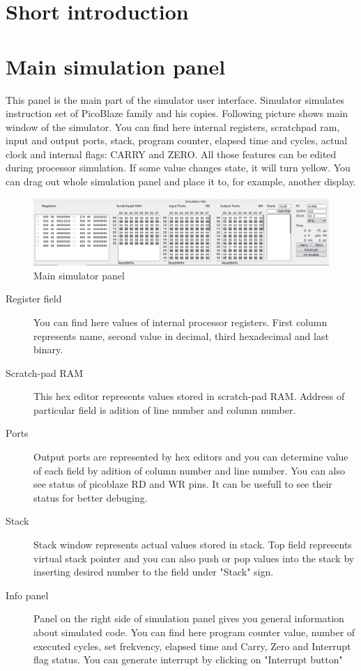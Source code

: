 \section{Short introduction}



\section{Main simulation panel}
    This panel is the main part of the simulator user interface. Simulator simulates instruction set of PicoBlaze family and his copies.
    Following picture shows main window of the simulator. You can find here internal registers, scratchpad ram, input and output ports, stack,
    program counter, elapsed time and cycles, actual clock and internal flags: CARRY and ZERO. All those features can be edited during
    processor simulation. If some value changes state, it will turn yellow. You can drag out whole simulation panel and place it to, for example, another display.
    
   \begin{figure}[h!]
        \centering
        \includegraphics[width=\textwidth]{img/bottom_panel.png}
        \caption{Main simulator panel}
    \end{figure}

    \begin{description}
     \item [Register field] You can find here values of internal processor registers. First column represents name, second value in decimal, third
     hexadecimal and last binary.
     \item [Scratch-pad RAM] This hex editor represents values stored in scratch-pad RAM. Address of particular field is adition of line number
     and column number.
     \item [Ports] Output ports are represented by hex editors and you can determine value of each field by adition of column number and line number.
     You can also see status of picoblaze RD and WR pins. It can be usefull to see their status for better debuging.
     \item [Stack] Stack window represents actual values stored in stack. Top field represents virtual stack pointer and you can also push or pop values into the stack
     by inserting desired number to the field under "Stack" sign.
     \item [Info panel] Panel on the right side of simulation panel gives you general information about simulated code. You can find here program counter
     value, number of executed cycles, set  frekvency, elapsed time and Carry, Zero and Interrupt flag status. You can generate interrupt by clicking on "Interrupt button"
    \end{description}


